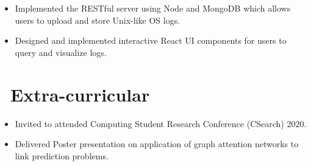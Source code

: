 \documentclass{resume}
\begin{document}
\begin{itemize}
	\item Implemented the RESTful server using Node and MongoDB which allows users to upload and store Unix-like OS logs.
	\item Designed and implemented interactive React UI components for users to query and visualize logs. 
\end{itemize}

\section{\faInfo\ Extra-curricular}
\begin{itemize}
	\item Invited to attended Computing Student Research Conference (CSearch) 2020.
	\item Delivered Poster presentation on application of graph attention networks to link prediction problems.
\end{itemize}
%
%
\end{document}
